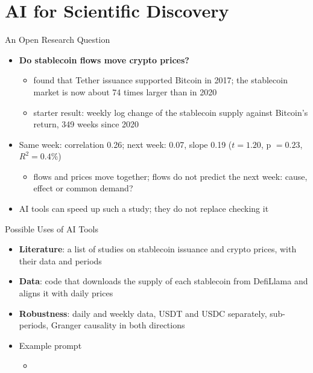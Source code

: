\section{AI for Scientific Discovery}

\begin{frame}{An Open Research Question}
\itemsize{\small}
\begin{itemize}
    \item \textbf{Do stablecoin flows move crypto prices?}
    \begin{itemize}
        \item {} found that Tether issuance supported Bitcoin in 2017; the stablecoin market is now about 74 times larger than in 2020
        \item starter result: weekly log change of the stablecoin supply against Bitcoin's return, 349 weeks since 2020
    \end{itemize}
    \item Same week: correlation 0.26; next week: 0.07, slope 0.19 ($t = 1.20$, p $= 0.23$, $R^2 = 0.4\%$)
    \begin{itemize}
        \item flows and prices move together; flows do not predict the next week: cause, effect or common demand?
    \end{itemize}
    \item AI tools can speed up such a study; they do not replace checking it 
\end{itemize}
\end{frame}

\begin{frame}{Possible Uses of AI Tools}
\itemsize{\small}
\begin{itemize}
    \item \textbf{Literature}: a list of studies on stablecoin issuance and crypto prices, with their data and periods
    \item \textbf{Data}: code that downloads the supply of each stablecoin from DefiLlama and aligns it with daily prices
    \item \textbf{Robustness}: daily and weekly data, USDT and USDC separately, sub-periods, Granger causality in both directions
    \item Example prompt
    \begin{itemize}
        \item {}
    \end{itemize}
\end{itemize}
\end{frame}

